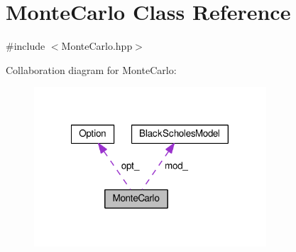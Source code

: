 \hypertarget{classMonteCarlo}{\section{Monte\-Carlo Class Reference}
\label{classMonteCarlo}
}


{\ttfamily \#include $<$Monte\-Carlo.\-hpp$>$}



Collaboration diagram for Monte\-Carlo\-:\nopagebreak
\begin{figure}[H]
\begin{center}
\leavevmode
\includegraphics[width=245pt]{classMonteCarlo__coll__graph}
\end{center}
\end{figure}
